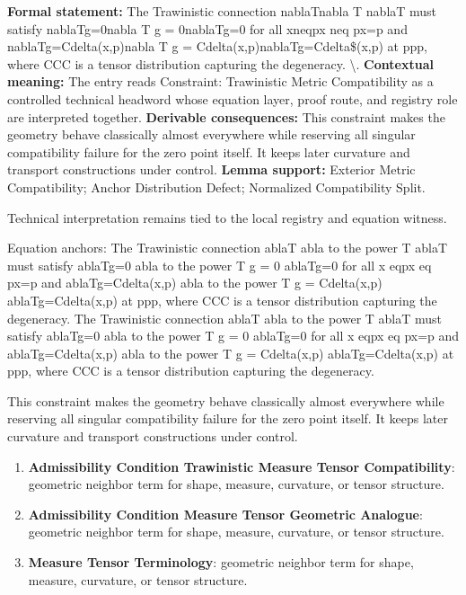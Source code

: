 \begingroup\footnotesize\setlength{\emergencystretch}{3em}\sloppy
\textbf{Formal statement:} The Trawinistic connection nablaTnabla T nablaT must satisfy nablaTg=0nabla T g = 0nablaTg=0 for all xneqpx neq px=p and nablaTg=Cdelta(x,p)nabla T g = Cdelta(x,p)nablaTg=Cdelta\$(x,p) at ppp, where CCC is a tensor distribution capturing the degeneracy. \textbackslash{}. \textbf{Contextual meaning:} The entry reads Constraint: Trawinistic Metric Compatibility as a controlled technical headword whose equation layer, proof route, and registry role are interpreted together. \textbf{Derivable consequences:} This constraint makes the geometry behave classically almost everywhere while reserving all singular compatibility failure for the zero point itself. It keeps later curvature and transport constructions under control. \textbf{Lemma support:} Exterior Metric Compatibility; Anchor Distribution Defect; Normalized Compatibility Split.\par
\endgroup

Technical interpretation remains tied to the local registry and equation witness.

Equation anchors: The Trawinistic connection ablaT abla to the power T ablaT must satisfy ablaTg=0 abla to the power T g = 0 ablaTg=0 for all x eqpx eq px=p and ablaTg=Cdelta(x,p) abla to the power T g = Cdelta(x,p) ablaTg=Cdelta(x,p) at ppp, where CCC is a tensor distribution capturing the degeneracy. The Trawinistic connection ablaT abla to the power T ablaT must satisfy ablaTg=0 abla to the power T g = 0 ablaTg=0 for all x eqpx eq px=p and ablaTg=Cdelta(x,p) abla to the power T g = Cdelta(x,p) ablaTg=Cdelta(x,p) at ppp, where CCC is a tensor distribution capturing the degeneracy.

This constraint makes the geometry behave classically almost everywhere while reserving all singular compatibility failure for the zero point itself. It keeps later curvature and transport constructions under control.
\endgroup

\begingroup\footnotesize\sloppy
\begin{enumerate}[leftmargin=1.35em,itemsep=1pt,topsep=1pt,parsep=0pt]
\item \textbf{Admissibility Condition Trawinistic Measure Tensor Compatibility}: geometric neighbor term for shape, measure, curvature, or tensor structure.
\item \textbf{Admissibility Condition Measure Tensor Geometric Analogue}: geometric neighbor term for shape, measure, curvature, or tensor structure.
\item \textbf{Measure Tensor Terminology}: geometric neighbor term for shape, measure, curvature, or tensor structure.
\end{enumerate}
\endgroup

